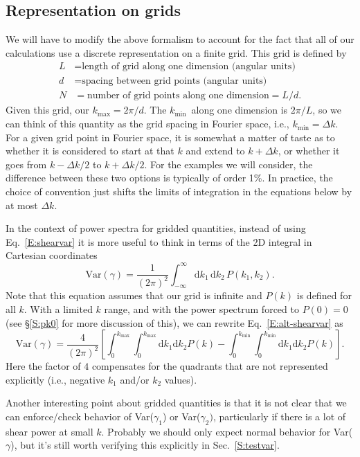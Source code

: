 \documentclass[preprint]{aastex}
\newcommand{\kmax}{\ensuremath{k_\mathrm{max}}}
\newcommand{\kmin}{\ensuremath{k_\mathrm{min}}}
\newcommand{\rmd}{\ensuremath{\mathrm{d}}}
\newcommand{\beq}{\begin{equation}}
\newcommand{\eeq}{\end{equation}}
\begin{document}
\subsection{Representation on grids}

We will have to modify the above formalism to account for the fact
that all of our calculations use a discrete representation on a finite
grid.  This 
grid is defined by
\begin{align}
L &= \mbox{length of grid along one dimension (angular units)}\\
d &= \mbox{spacing between grid points (angular units)}\\
N &= \mbox{number of grid points along one dimension} = L/d.
\end{align}
Given this grid, our $\kmax=2\pi/d$.  The \kmin\ along one dimension
is $2\pi/L$, so we can think of this quantity as the grid spacing in
Fourier space, i.e., $\kmin=\Delta k$.  For a given grid point in
Fourier space, it is
somewhat a matter of taste as to whether it is considered to start at
that $k$ and extend to $k+\Delta k$, or whether it goes from $k-\Delta
k/2$ to $k+\Delta k/2$.  For the examples we will consider, the
difference between these two options is typically of order 1\%.  In
practice, the choice of convention just shifts the limits of
integration in the equations below by at most $\Delta k$.

In the context 
of power spectra for gridded quantities, instead of using
Eq.~\ref{E:shearvar} it is more useful to think in
terms of the 2D integral in Cartesian coordinates
\beq\label{E:alt-shearvar}
\mathrm{Var}(\gamma) = \frac{1}{(2\pi)^2} \int_{-\infty}^{\infty} \rmd k_1 \,\rmd k_2 \,
P(k_1, k_2).
\eeq
Note that this equation assumes that our grid is infinite and $P(k)$
is defined for all $k$.  With a limited $k$
range, and with the power spectrum forced to $P(0)=0$ (see \S\ref{S:pk0}
for more discussion of this), we can rewrite Eq.~\ref{E:alt-shearvar} as
\beq\label{E:alt-shearvar-limit}
\mathrm{Var}(\gamma) = \frac{4}{(2\pi)^2} \left[\int_{0}^{\kmax}\int_{0}^{\kmax} \rmd
k_1 \rmd k_2 P(k) - \int_{0}^{\kmin}\int_{0}^{\kmin} \rmd k_1 \rmd k_2
P(k)\right].
\eeq
Here the factor of $4$ compensates for the 
quadrants that are not represented explicitly (i.e., negative $k_1$
and/or $k_2$ values).

Another interesting point about gridded quantities is that it is not
clear that we 
can enforce/check behavior of Var($\gamma_1$) or Var($\gamma_2)$,
particularly if 
there is a lot of shear power at small $k$.  Probably we should 
 only expect normal behavior for Var($\gamma$), but it's still worth
 verifying this explicitly in Sec.~\ref{S:testvar}.
\end{document}

